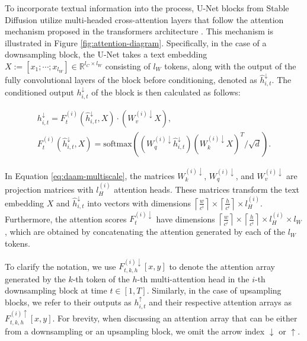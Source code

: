 To incorporate textual information into the process, U-Net blocks from Stable Diffusion utilize multi-headed cross-attention layers that follow the attention mechanism proposed in the transformers architecture \cite{rombach2022high, vaswani2017attention}. This mechanism is illustrated in Figure \ref{fig:attention-diagram}. Specifically, in the case of a downsampling block, the U-Net takes a text embedding $X:= \left [ x_1; \cdots; x_{l_W}\right ] \in \mathbb{R}^{l_C \times l_W}$ consisting of $l_W$ tokens, along with the output of the fully convolutional layers of the block before conditioning, denoted as $\hat{h}_{i, t}^\downarrow$. The conditioned output $h_{i, t}^\downarrow$ of the block is then calculated as follows:


\begin{equation}
\label{eq:daam-multiscale}
\begin{gathered}
    h_{i,t}^{\downarrow} = F_t^{(i)} \left ( \hat{h}_{i, t}^{\downarrow}, X \right ) \cdot \left( W_v^{(i)\downarrow}  X \right), \\
     F_t^{(i)} \left ( \hat{h}_{i, t}^{\downarrow}, X \right ) = \text{softmax} \left( (W_q^{(i)\downarrow} \hat{h}_{i, t}^{\downarrow})  (W_k^{(i)\downarrow} X)^T / \sqrt{d} \right).
\end{gathered}
\end{equation}

In Equation \ref{eq:daam-multiscale}, the matrices $W_{k}^{(i)\downarrow}$, $W_{q}^{(i)\downarrow}$, and $W_{v}^{(i)\downarrow}$ are projection matrices with $l_{H}^{(i)}$ attention heads. These matrices transform the text embedding $X$ and $\hat{h}_{i, t}^{\downarrow}$ into vectors with dimensions $\left \lceil \frac{w}{c^i} \right \rceil \times \left \lceil \frac{h}{c^i} \right \rceil \times l_H^{(i)}$. Furthermore, the attention scores $F_{t}^{(i)\downarrow}$ have dimensions $\left \lceil \frac{w}{c^i} \right \rceil \times \left \lceil \frac{h}{c^i} \right \rceil \times l_H^{(i)} \times l_W$, which are obtained by concatenating the attention generated by each of the $l_W$ tokens.

To clarify the notation, we use $F_{t, k, h}^{(i)\downarrow}[x, y]$ to denote the attention array generated by the $k$-th token of the $h$-th multi-attention head in the $i$-th downsampling block at time $t \in \left [1, T \right]$. Similarly, in the case of upsampling blocks, we refer to their outputs as $h_{i, t}^\uparrow$ and their respective attention arrays as $F_{t, k, h}^{(i)\uparrow}[x, y]$. For brevity, when discussing an attention array that can be either from a downsampling or an upsampling block, we omit the arrow index $\downarrow$ or $\uparrow$.

